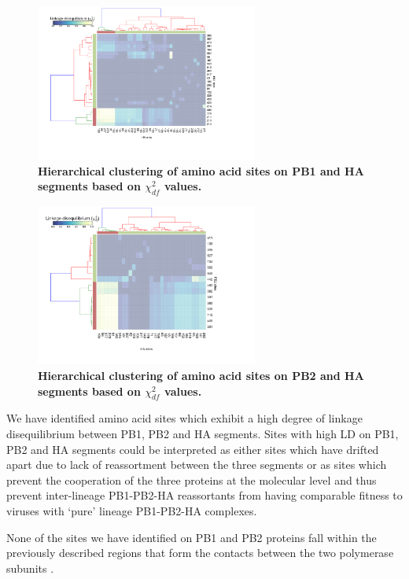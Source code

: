 \documentclass[11pt,oneside,letterpaper]{article}
\begin{document}
\begin{figure}
\centering  
\includegraphics[width=0.65\textwidth]  {supp_figures/Chi_PB1_HA.png}
\caption{\textbf{Hierarchical clustering of amino acid sites on PB1 and HA segments based on $\chi^{2}_{df}$ values.}}
\label{ChiPB1HA}
\end{figure}


\begin{figure}
\centering  
\includegraphics[width=0.65\textwidth]  {supp_figures/Chi_PB2_HA.png}
\caption{\textbf{Hierarchical clustering of amino acid sites on PB2 and HA segments based on $\chi^{2}_{df}$ values.}}
\label{ChiPB2HA}
\end{figure}

We have identified amino acid sites which exhibit a high degree of linkage disequilibrium between PB1, PB2 and HA segments.
Sites with high LD on PB1, PB2 and HA segments could be interpreted as either sites which have drifted apart due to lack of reassortment between the three segments or as sites which prevent the cooperation of the three proteins at the molecular level and thus prevent inter-lineage PB1-PB2-HA reassortants from having comparable fitness to viruses with `pure' lineage PB1-PB2-HA complexes.

None of the sites we have identified on PB1 and PB2 proteins fall within the previously described regions that form the contacts between the two polymerase subunits \cite{sugiyama2009}.
\end{document}

